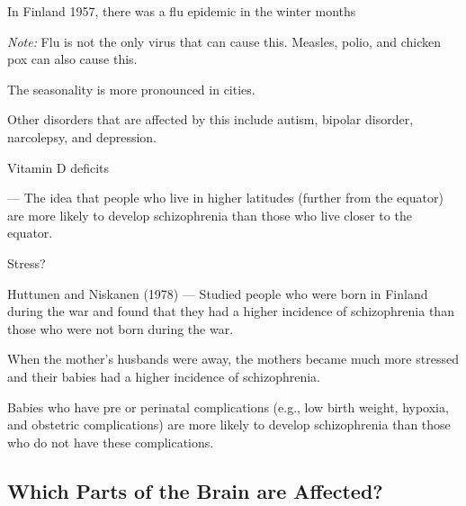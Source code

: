 \begin{coloredlist}
\begin{coloredlist}
\begin{coloredlist}
\begin{coloredlist}
\begin{coloredlist}
\begin{coloredlist}
                        \item In Finland 1957, there was a flu epidemic in the winter months
                        \item \textit{Note:} Flu is not the only virus that can cause this. Measles, polio, and chicken pox can also cause this.
                    \end{coloredlist}
                    \item The seasonality is more pronounced in cities.
                    \item Other disorders that are affected by this include autism, bipolar disorder, narcolepsy, and depression.
                \end{coloredlist}
            \end{coloredlist}
            \item Vitamin D deficits
            \begin{coloredlist}
                \item {} — The idea that people who live in higher latitudes (further from the equator) are more likely to develop schizophrenia than those who live closer to the equator.
            \end{coloredlist}
            \item Stress?
            \begin{coloredlist}
                \item Huttunen and Niskanen (1978) — Studied people who were born in Finland during the war and found that they had a higher incidence of schizophrenia than those who were not born during the war.
                \begin{coloredlist}
                    \item When the mother's husbands were away, the mothers became much more stressed and their babies had a higher incidence of schizophrenia.
                \end{coloredlist}
            \end{coloredlist}
            \item Babies who have pre or perinatal complications (e.g., low birth weight, hypoxia, and obstetric complications) are more likely to develop schizophrenia than those who do not have these complications.
        \end{coloredlist}
    \end{coloredlist}
\end{coloredlist}

\subsection{Which Parts of the Brain are Affected?}

